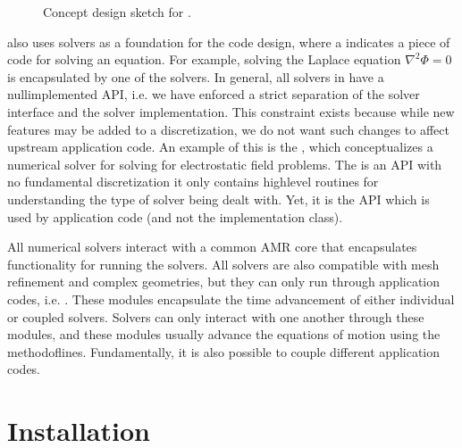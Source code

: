 \documentclass[letterpaper,10pt,english]{sphinxmanual}
\let\sphinxpxdimen\pdfpxdimen\else\newdimen\sphinxpxdimen
\begin{document}
\begin{figure}[htb]
\centering
\capstart

\noindent\sphinxincludegraphics[width=600\sphinxpxdimen]{{Design}.png}
\caption{Concept design sketch for .}\label{\detokenize{Base/Overview:id2}}\label{\detokenize{Base/Overview:fig-design}}\end{figure}

 also uses  solvers as a foundation for the code design, where a  indicates a piece of code for solving an equation.
For example, solving the Laplace equation \(\nabla^2\Phi = 0\) is encapsulated by one of the  solvers.
In general, all solvers in  have a null\sphinxhyphen{}implemented API, i.e. we have enforced a strict separation of the solver interface and the solver implementation.
This constraint exists because while new features may be added to a discretization, we do not want such changes to affect upstream application code.
An example of this is the , which conceptualizes a numerical solver for solving for electrostatic field problems.
The  is an API with no fundamental discretization \textendash{} it only contains high\sphinxhyphen{}level routines for understanding the type of solver being dealt with.
Yet, it is the  API which is used by application code (and not the implementation class).

All numerical solvers interact with a common AMR core that encapsulates functionality for running the solvers.
All solvers are also compatible with mesh refinement and complex geometries, but they can only run through application codes, i.e. .
These modules encapsulate the time advancement of either individual or coupled solvers.
Solvers can only interact with one another through these modules, and these modules usually advance the equations of motion using the method\sphinxhyphen{}of\sphinxhyphen{}lines.
Fundamentally, it is also possible to couple different application codes.


\section{Installation}
\label{\detokenize{Base/GettingStarted:installation}}\label{\detokenize{Base/GettingStarted:chap-gettingstarted}}\label{\detokenize{Base/GettingStarted::doc}}
\end{document}
